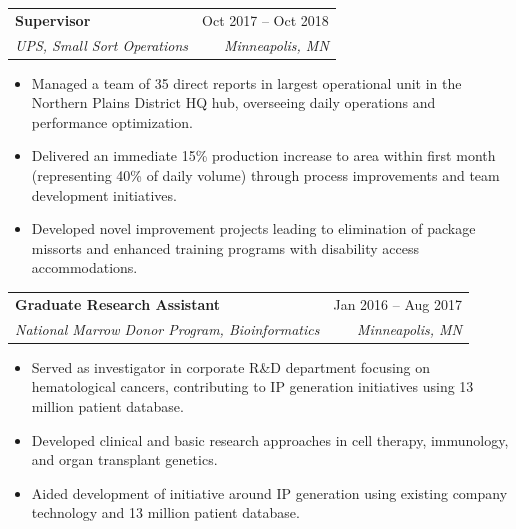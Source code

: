\documentclass[letterpaper,11pt]{article}
\makeatletter
\newcommand{\resumeItem}[1]{
  \item\small{
    {#1 \vspace{-2pt}}
  }
}
\newcommand{\resumeSubheading}[4]{
  \vspace{-2pt}\item
    \begin{tabular*}{0.97\textwidth}[t]{l@{\extracolsep{\fill}}r}
      \textbf{#1} & #2 \\
      \textit{\small#3} & \textit{\small #4} \\
    \end{tabular*}\vspace{-7pt}
}
\newcommand{\resumeItemListStart}{\begin{itemize}}
\newcommand{\resumeItemListEnd}{\end{itemize}\vspace{-5pt}}
\makeatother
\begin{document}
    \resumeSubheading
      {Supervisor}{Oct 2017 -- Oct 2018}
      {UPS, Small Sort Operations}{Minneapolis, MN}
      \resumeItemListStart
        \resumeItem{Managed a team of 35 direct reports in largest operational unit in the Northern Plains District HQ hub, overseeing daily operations and performance optimization.}
        \resumeItem{Delivered an immediate 15\% production increase to area within first month (representing 40\% of daily volume) through process improvements and team development initiatives.}
        \resumeItem{Developed novel improvement projects leading to elimination of package missorts and enhanced training programs with disability access accommodations.}
      \resumeItemListEnd

%    
%    

    \resumeSubheading
      {Graduate Research Assistant}{Jan 2016 -- Aug 2017}
      {National Marrow Donor Program, Bioinformatics}{Minneapolis, MN}
      \resumeItemListStart
        \resumeItem{Served as investigator in corporate R\&D department focusing on hematological cancers, contributing to IP generation initiatives using 13 million patient database.}
        \resumeItem{Developed clinical and basic research approaches in cell therapy, immunology, and organ transplant genetics.}
        \resumeItem{Aided development of initiative around IP generation using existing company technology and 13 million patient database.}
      \resumeItemListEnd
\end{document}
